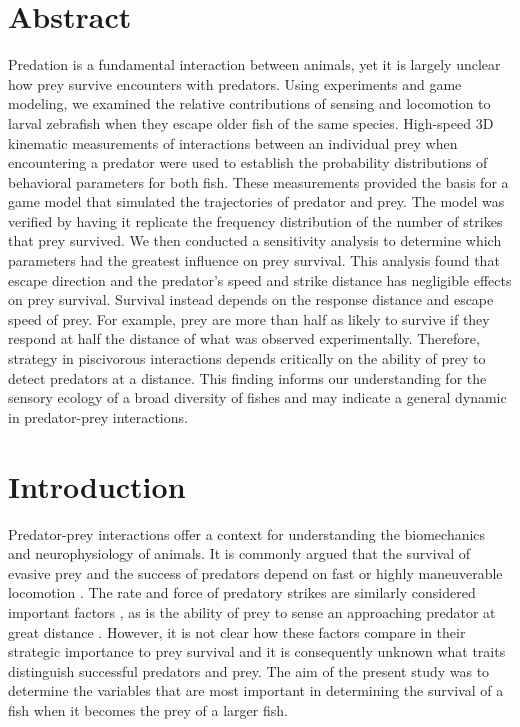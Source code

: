 \documentclass[]{rsos}%
\begin{document}
\section*{Abstract}
Predation is a fundamental interaction between animals, yet it is largely unclear how prey survive encounters with predators.
Using experiments and game modeling, we examined the relative contributions of sensing and locomotion to larval zebrafish when they escape older fish of the same species.
High-speed 3D kinematic measurements of interactions between an individual prey when encountering a predator were used to establish the probability distributions of behavioral parameters for both fish.
These measurements provided the basis for a game model that simulated the trajectories of predator and prey. 
The model was verified by having it replicate the frequency distribution of the number of strikes that prey survived.
We then conducted a sensitivity analysis to determine which parameters had the greatest influence on prey survival.
This analysis found that escape direction and the predator's speed and strike distance has negligible effects on prey survival.
Survival instead depends on the response distance and escape speed of prey. 
For example, prey are more than half as likely to survive if they respond at half the distance of what was observed experimentally.
Therefore, strategy in piscivorous interactions depends critically on the ability of prey to detect predators at a distance.
This finding informs our understanding for the sensory ecology of a broad diversity of fishes and may indicate a general dynamic in predator-prey interactions.


\section{Introduction}

Predator-prey interactions offer a context for understanding the biomechanics and neurophysiology of animals.
It is commonly argued that the survival of evasive prey and the success of predators depend on fast or highly maneuverable locomotion \cite{Alexander:BbR35qCj, Wilson:2013fda, Walker:2005vn}.
The rate and force of predatory strikes are similarly considered important factors \cite{deVries:2012tc, Holzman:2009uu}, as is the ability of prey to sense an approaching predator at great distance \cite{Dill:1972wh, Gabbiani:1999wz}.
However, it is not clear how these factors compare in their strategic importance to prey survival and it is consequently unknown what traits distinguish successful predators and prey. 
The aim of the present study was to determine the variables that are most important in determining the survival of a fish when it becomes the prey of a larger fish.
\end{document}
